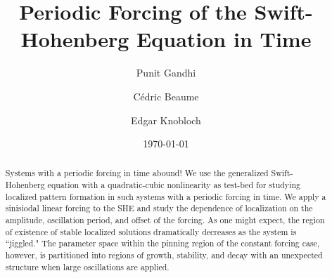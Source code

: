 \documentclass[pre,longbibliography,12pt,a4paper,preprint]{revtex4-1}
\begin{document}


\title{Periodic Forcing of the Swift-Hohenberg Equation in Time}
\author{Punit Gandhi}
\author{C\'edric Beaume}
\author{Edgar Knobloch}
\date{\today}

\begin{abstract}
Systems with a periodic forcing in time abound!  We use the generalized Swift-Hohenberg equation with a quadratic-cubic nonlinearity as test-bed for studying localized pattern formation in such systems with a periodic forcing in time.  We apply a sinisiodal linear forcing to the SHE and study the dependence of localization on the amplitude, oscillation period, and offset of the forcing.  As one might expect, the region of existence of stable localized solutions dramatically decreases as the system is ``jiggled."  The parameter space within the pinning region of the constant forcing case, however, is partitioned into regions of growth, stability, and decay with an unexpected structure when large oscillations are applied. 

\end{abstract}

\maketitle






\newpage







\newpage






\end{document}
